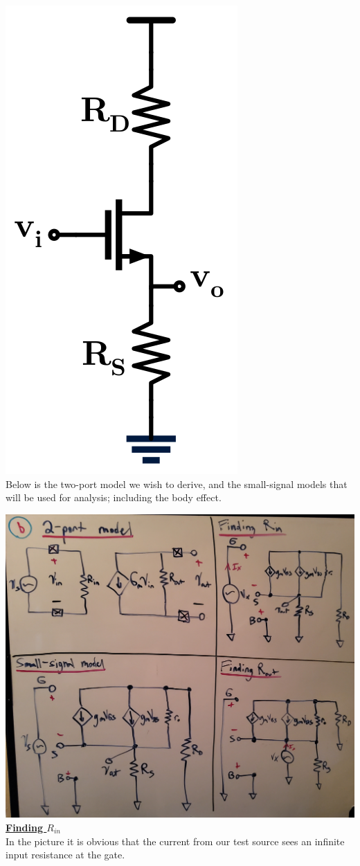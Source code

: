 \documentclass[12pt, fleqn]{article}
\begin{document}
\begin{enumerate}[label=(\alph*)]
{    \includegraphics[scale=0.25, center]{p2b.png}\\
    Below is the two-port model we wish to derive, and the small-signal models that will be used for analysis; including the body effect.
    
    \includegraphics[scale=0.1, center]{p2b.jpg}\\
    \newpage
    \underline{\textbf{Finding $R_{in}$}}\\[0.25cm]
    In the picture it is obvious that the current from our test source sees an infinite input resistance at the gate.
    
}
\end{enumerate}
\end{document}
